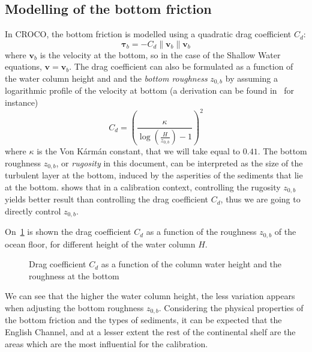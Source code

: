 \documentclass[../../Main_ManuscritThese.tex]{subfiles}
\newcommand{\CROCO}{CROCO}
\newcommand{\zob}{z_{0,b}}
\newcommand\imgpath{/home/victor/acadwriting/Manuscrit/Text/Chapter5/img/}
\begin{document}
\subsection{Modelling of the bottom friction}
\label{ssec:modelling_bottom}
In \CROCO, the bottom friction is modelled using a quadratic drag
coefficient $C_d$:
\begin{equation}
    \label{eq:bottom_stress_tau}
    \bm{\tau}_b= -C_d \|\mathbf{v}_b\|\mathbf{v}_b 
  \end{equation}
  where $\mathbf{v}_b$ is the velocity at the bottom, so in the case
  of the Shallow Water equations, $\mathbf{v} = \mathbf{v}_b$.  The
  drag coefficient can also be formulated as a function of the water
  column height and and the \emph{bottom roughness} $\zob$ by assuming a
  logarithmic profile of the velocity at bottom (a derivation can be found in~\cite{le_bars_amandes_2010} for instance)
  \begin{equation}
    \label{eq:quadratic_friction_vonkarman}
  C_d = \left(\frac{\kappa}{\log\left(\frac{H}{\zob}\right) - 1}\right)^2%
\end{equation}
where $\kappa$ is the Von K\'arm\'an constant, that we will take equal
to $0.41$.  The bottom roughness $\zob$, or \emph{rugosity} in this
document, can be interpreted as the size of the turbulent layer at the
bottom, induced by the asperities of the sediments that lie at the
bottom. \cite{boutet_estimation_2015} shows that in a calibration
context, controlling the rugosity $\zob$ yields better result than
controlling the drag coefficient $C_d$, thus we are going to directly
control $\zob$.


On~\cref{fig:cd_zob} is shown the drag coefficient $C_d$ as a function
of the roughness $\zob$ of the ocean floor, for different height of
the water column $H$.
\begin{figure}[ht]
  \centering 
  \caption{\label{fig:cd_zob} Drag coefficient $C_d$ as a function of
    the column water height and the roughness at the bottom}
\end{figure}
We can see that the higher the water column height, the less variation
appears when adjusting the bottom roughness $\zob$.  Considering the
physical properties of the bottom friction and the types of sediments,
it can be expected that the English Channel, and at a lesser extent
the rest of the continental shelf are the areas which are the most
influential for the calibration.
\end{document}
